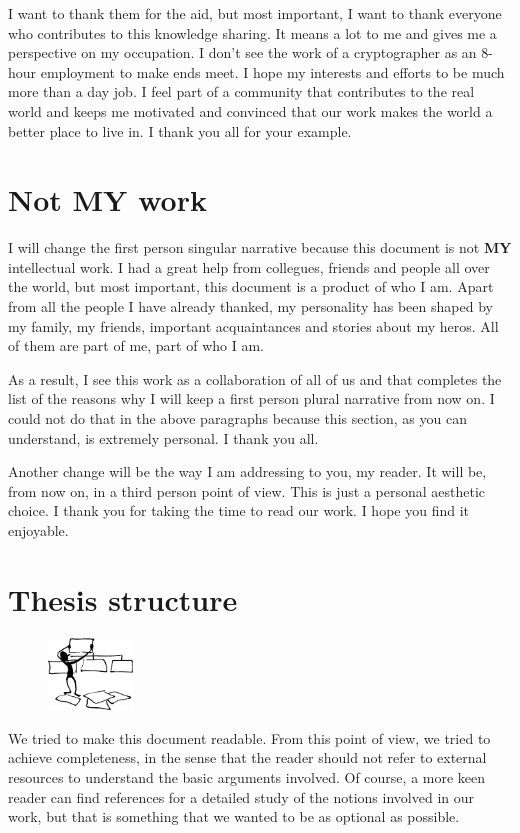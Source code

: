 I want to thank them for the aid, but most important, I want to thank everyone who contributes to this knowledge sharing. It means a lot to me and gives me a perspective on my occupation. I don't see the work of a cryptographer as an 8-hour employment to make ends meet. I hope my interests and efforts to be much more than a day job. I feel part of a community that contributes to the real world and keeps me motivated and convinced that our work makes the world a better place to live in. I thank you all for your example.
%
\section{Not MY work}
I will change the first person singular narrative because this document is not \textbf{MY} intellectual work. I had a great help from collegues, friends and people all over the world, but most important, this document is a product of who I am. Apart from all the people I have already thanked, my personality has been shaped by my family, my friends, important acquaintances and stories about my heros. All of them are part of me, part of who I am.

As a result, I see this work as a collaboration of all of us and that completes the list of the reasons why I will keep a first person plural narrative from now on. I could not do that in the above paragraphs because this section, as you can understand, is extremely personal. I thank you all.

Another change will be the way I am addressing to you, my reader. It will be, from now on, in a third person point of view. This is just a personal aesthetic choice. I thank you for taking the time to read our work. I hope you find it enjoyable.

\section{Thesis structure}
\setlength{\intextsep}{2pt}
\begin{figure}
\centering
\includegraphics[width=0.2\textwidth]{Images/Introduction/structure.png}
\end{figure}
We tried to make this document readable. From this point of view, we tried to achieve completeness, in the sense that the reader should not refer to external resources to understand the basic arguments involved. Of course, a more keen reader can find references for a detailed study of the notions involved in our work, but that is something that we wanted to be as optional as possible.


